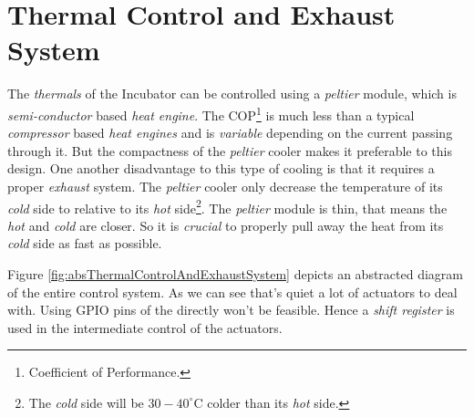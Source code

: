 \documentclass[../../main]{subfiles}
\begin{document}
\section{Thermal Control and Exhaust System} \label{sec:thermalControlAndExhaustSystem}

The \emph{thermals} of the Incubator can be controlled using a \emph{peltier} module, which is
\emph{semi-conductor} based \emph{heat engine}. The COP\footnote{Coefficient of Performance.} is
much less than a typical \emph{compressor} based \emph{heat engines} and is \emph{variable} depending
on the current passing through it. But the compactness of the \emph{peltier} cooler makes it preferable
to this design. One another disadvantage to this type of cooling is that it requires a proper \emph{exhaust}
system. The \emph{peltier} cooler only decrease the temperature of its \emph{cold} side to relative to its
\emph{hot} side\footnote{The \emph{cold} side will be $30 - 40^\circ$C colder than its \emph{hot} side.}.
The \emph{peltier} module is thin, that means the \emph{hot} and \emph{cold} are closer. So it is
\emph{crucial} to properly pull away the heat from its \emph{cold} side as fast as possible.




\vfill


\vfill

Figure \ref{fig:absThermalControlAndExhaustSystem} depicts an abstracted diagram of the entire control
system. As we can see that's quiet a lot of actuators to deal with. Using GPIO pins of the \esp directly won't
be feasible. Hence a \emph{shift register} is used in the intermediate control of the actuators.
\end{document}
